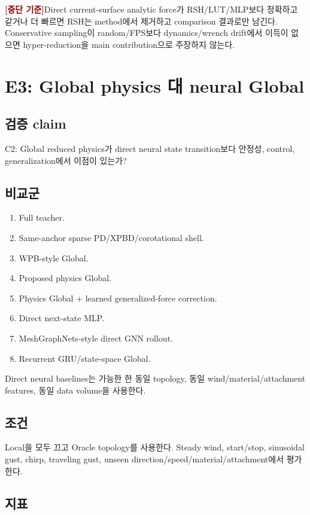 \documentclass[11pt,a4paper]{article}
\newcommand{\killgate}{\textcolor{darkred}{\textbf{[중단 기준]}}}
\begin{document}
\killgate Direct current-surface analytic force가 RSH/LUT/MLP보다
정확하고 같거나 더 빠르면 RSH는 method에서 제거하고 comparison 결과로만 남긴다.
Conservative sampling이 random/FPS보다 dynamics/wrench drift에서 이득이 없으면
hyper-reduction을 main contribution으로 주장하지 않는다.

\section{E3: Global physics 대 neural Global}

\subsection*{검증 claim}

C2: Global reduced physics가 direct neural state transition보다
안정성, control, generalization에서 이점이 있는가?

\subsection*{비교군}

\begin{enumerate}[leftmargin=1.7em]
  \item Full teacher.
  \item Same-anchor sparse PD/XPBD/corotational shell.
  \item WPB-style Global.
  \item Proposed physics Global.
  \item Physics Global + learned generalized-force correction.
  \item Direct next-state MLP.
  \item MeshGraphNets-style direct GNN rollout.
  \item Recurrent GRU/state-space Global.
\end{enumerate}

Direct neural baselines는 가능한 한 동일 topology,
동일 wind/material/attachment features, 동일 data volume을 사용한다.

\subsection*{조건}

Local을 모두 끄고 Oracle topology를 사용한다.
Steady wind, start/stop, sinusoidal gust, chirp, traveling gust,
unseen direction/speed/material/attachment에서 평가한다.

\subsection*{지표}
\end{document}
